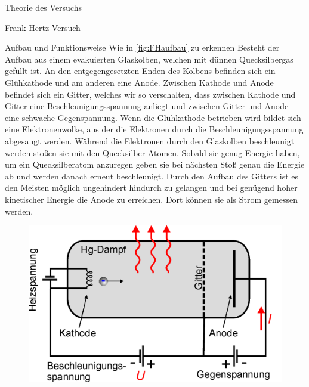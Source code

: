 \documentclass[pdftex, a4paper,11pt, twoside, ngerman]{report}
\begin{document}
\begin{chapter}{Theorie des Versuchs}
\begin{section}{Frank-Hertz-Versuch}
      \begin{subsection}{Aufbau und Funktionsweise}
        Wie in \cref{fig:FHaufbau} zu erkennen Besteht der Aufbau aus einem
        evakuierten Glaskolben, welchen mit dünnen Quecksilbergas gefüllt ist. 
        An den entgegengesetzten Enden des Kolbens befinden sich ein
        Glühkathode und am anderen eine Anode. Zwischen Kathode und Anode
        befindet sich ein Gitter, welches wir so verschalten, dass zwischen
        Kathode und Gitter eine Beschleunigungsspannung anliegt und zwischen
        Gitter und Anode eine schwache Gegenspannung. Wenn die Glühkathode
        betrieben wird bildet sich eine Elektronenwolke, aus der die Elektronen
        durch die Beschleunigungsspannung abgesaugt werden. Während die
        Elektronen durch den Glaskolben beschleunigt werden stoßen sie mit den
        Quecksilber Atomen. Sobald sie genug Energie haben, um ein
        Quecksilberatom anzuregen geben sie bei nächsten Stoß genau die Energie
        ab und werden danach erneut beschleunigt. Durch den Aufbau des Gitters
        ist es den Meisten möglich ungehindert hindurch zu gelangen und bei
        genügend hoher kinetischer Energie die Anode zu erreichen. Dort können
        sie als Strom gemessen werden.
        \begin{figure}[ht]
          \centering
          \begin{minipage}{0.48\textwidth}
            \centering
            \includegraphics[width=\textwidth]{Figures/hertz.png}

\end{minipage}
\end{figure}
\end{subsection}
\end{section}
\end{chapter}
\end{document}
